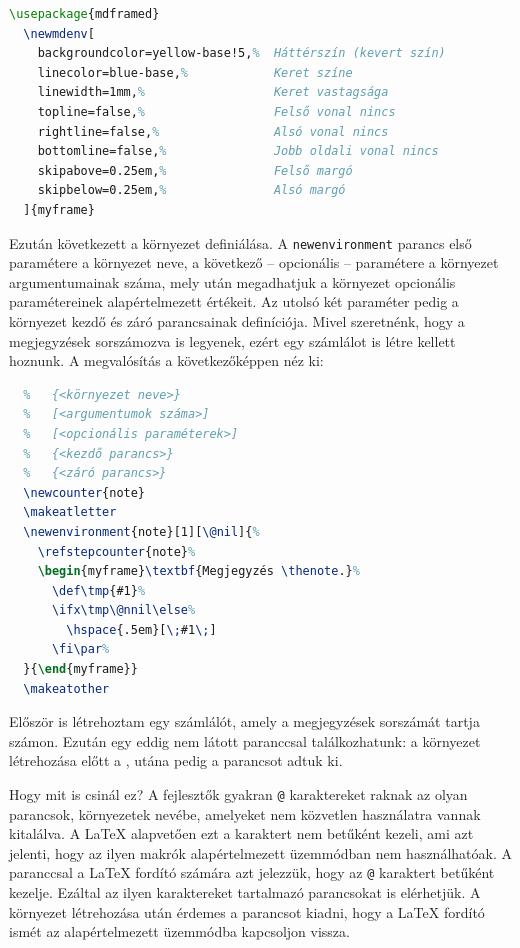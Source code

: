 \begin{lstlisting}[language=tex,caption={Saát megjegyzés környezet}]
  \usepackage{mdframed}
  \newmdenv[
    backgroundcolor=yellow-base!5,%  Háttérszín (kevert szín)
    linecolor=blue-base,%            Keret színe
    linewidth=1mm,%                  Keret vastagsága
    topline=false,%                  Felső vonal nincs
    rightline=false,%                Alsó vonal nincs
    bottomline=false,%               Jobb oldali vonal nincs
    skipabove=0.25em,%               Felső margó
    skipbelow=0.25em,%               Alsó margó
  ]{myframe}
\end{lstlisting}

Ezután következett a környezet definiálása. A \texttt{newenvironment} parancs
első paramétere a környezet neve, a következő -- opcionális -- paramétere a
környezet argumentumainak száma, mely után megadhatjuk a környezet opcionális
paramétereinek alapértelmezett értékeit. Az utolsó két paraméter pedig a
környezet kezdő és záró parancsainak definíciója. Mivel szeretnénk, hogy a
megjegyzések sorszámozva is legyenek, ezért egy számlálot is létre kellett
hoznunk. A megvalósítás a következőképpen néz ki:

\begin{lstlisting}[language=tex,caption={Megjegyzés környezet}]
  % \newenvironment
  %   {<környezet neve>}
  %   [<argumentumok száma>]
  %   [<opcionális paraméterek>]
  %   {<kezdő parancs>}
  %   {<záró parancs>}
  \newcounter{note}
  \makeatletter
  \newenvironment{note}[1][\@nil]{%
    \refstepcounter{note}%
    \begin{myframe}\textbf{Megjegyzés \thenote.}%
      \def\tmp{#1}%
      \ifx\tmp\@nnil\else%
        \hspace{.5em}[\;#1\;]
      \fi\par%
  }{\end{myframe}}
  \makeatother
\end{lstlisting}

Először is létrehoztam egy számlálót, amely a megjegyzések sorszámát tartja
számon. Ezután egy eddig nem látott paranccsal találkozhatunk: a környezet
létrehozása előtt a
,
utána pedig a
parancsot adtuk ki.

Hogy mit is csinál ez? A fejlesztők gyakran \texttt{@}
karaktereket raknak az olyan parancsok, környezetek nevébe, amelyeket nem
közvetlen használatra vannak kitalálva. A \LaTeX{} alapvetően ezt a karaktert
nem betűként kezeli, ami azt jelenti, hogy az ilyen makrók alapértelmezett
üzemmódban nem használhatóak. A
paranccsal a \LaTeX{} fordító számára azt jelezzük, hogy az \texttt{@} karaktert
betűként kezelje. Ezáltal az ilyen karaktereket tartalmazó parancsokat is
elérhetjük. A környezet létrehozása után érdemes a
parancsot kiadni, hogy a \LaTeX{} fordító ismét az alapértelmezett üzemmódba
kapcsoljon vissza.

